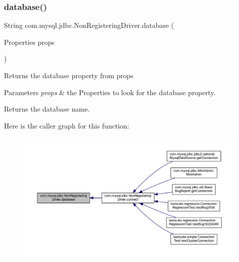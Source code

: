\subsubsection{\texorpdfstring{database()}{database()}}
{\footnotesize\ttfamily String com.\+mysql.\+jdbc.\+Non\+Registering\+Driver.\+database (\begin{DoxyParamCaption}\item[{Properties}]{props }\end{DoxyParamCaption})}

Returns the database property from {\ttfamily props}


\begin{DoxyParams}{Parameters}
{\em props} & the Properties to look for the database property.\\
\hline
\end{DoxyParams}
\begin{DoxyReturn}{Returns}
the database name. 
\end{DoxyReturn}
Here is the caller graph for this function\+:
\nopagebreak
\begin{figure}[H]
\begin{center}
\leavevmode
\includegraphics[width=350pt]{classcom_1_1mysql_1_1jdbc_1_1_non_registering_driver_a909c0d681654054551d09e9c842f5727_icgraph}
\end{center}
\end{figure}
\mbox{\label{classcom_1_1mysql_1_1jdbc_1_1_non_registering_driver_ab113b21e7be85905b13ac3f1ec511a09}} 
